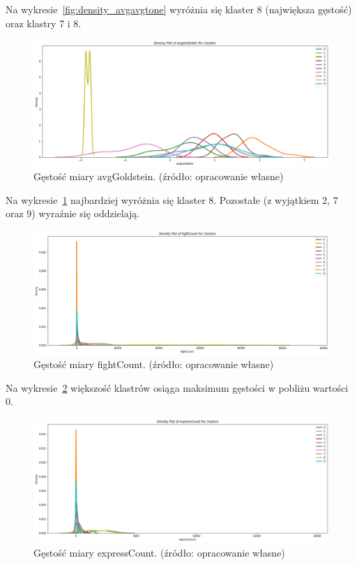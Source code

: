 \documentclass[11pt]{report}
\begin{document}
    Na wykresie~\ref{fig:density_avgavgtone} wyróżnia się klaster 8 (największa gęstość) oraz klastry 7 i 8.


    \begin{figure}[!htp]
        \centering
        \includegraphics[width=\linewidth]{fig/CLUST/density_avgGoldstein.png}
        \caption{Gęstość miary avgGoldstein. (źródło: opracowanie własne)}
        \label{fig:density_avggoldstein}
    \end{figure}

    Na wykresie~\ref{fig:density_avggoldstein} najbardziej wyróżnia się klaster 8.
    Pozostałe (z wyjątkiem 2, 7 oraz 9) wyraźnie się oddzielają.

    \begin{figure}[!htp]
        \centering
        \includegraphics[width=\linewidth]{fig/CLUST/density_fightCount.png}
        \caption{Gęstość miary fightCount. (źródło: opracowanie własne)}
        \label{fig:density_fightcount}
    \end{figure}

    Na wykresie~\ref{fig:density_fightcount} większość klastrów osiąga maksimum gęstości w pobliżu wartości 0.

    \begin{figure}[!htp]
        \centering
        \includegraphics[width=\linewidth]{fig/CLUST/density_expressCount.png}
        \caption{Gęstość miary expressCount. (źródło: opracowanie własne)}
        \label{fig:density_expresscount}
    \end{figure}
\end{document}
